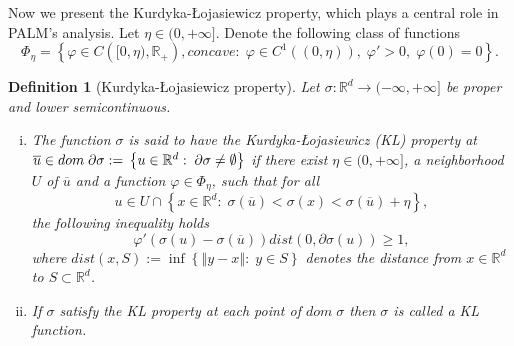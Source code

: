 \documentclass[12pt]{article}
\numberwithin{equation}{section}
\newtheorem{definition}{Definition}
\newcommand{\rr}{\mathbb{R}} %
\newcommand{\norm}[1]{\left\Vert {#1} \right\Vert} %
\begin{document}
Now we present the Kurdyka-{\L}ojasiewicz property, which plays a central role in PALM's analysis. Let $\eta \in (0,+\infty]$. Denote the following class of functions
\begin{equation*}
	\Phi_{\eta} = \left\lbrace \varphi \in C\left([0,\eta), \rr_+ \right)  , concave : \; \varphi \in C^1\left((0,\eta)\right), \; \varphi'>0, \; \varphi(0)=0 \right\rbrace .
\end{equation*}
\begin{definition}[Kurdyka-{\L}ojasiewicz property]
	Let $\sigma: \rr^d \rightarrow (-\infty,+\infty]$ be proper and lower semicontinuous.
	\begin{enumerate}[(i)]
		\item The function $\sigma$ is said to have the \textit{Kurdyka-{\L}ojasiewicz (KL) property} at $\overline{u} \in dom \; \partial\sigma := \\ \left\lbrace u \in \rr^d : \; \partial\sigma \neq \emptyset \right\rbrace$ if there exist $\eta \in (0,+\infty]$, a neighborhood $U$ of $\overline{u}$ and a function $\varphi \in \Phi_{\eta}$, such that for all
		\begin{equation*}
			u \in U \cap \left\lbrace x \in \rr^d : \; \sigma(\overline{u}) < \sigma(x) < \sigma(\overline{u}) + \eta \right\rbrace,
		\end{equation*}
		the following inequality holds
		\begin{equation*}
			\varphi'(\sigma(u) - \sigma(\overline{u}))dist(0,\partial\sigma(u)) \geq 1,
		\end{equation*}
		where $dist(x,S) := \inf \left\lbrace \norm{y-x} : \; y \in S\right\rbrace$ denotes the distance from $x \in \rr^d$ to $S \subset \rr^d$.
		\item If $\sigma$ satisfy the KL property at each point of $dom\;\sigma$ then $\sigma$ is called a \textit{KL function}.
	\end{enumerate}
\end{definition}
\end{document}
